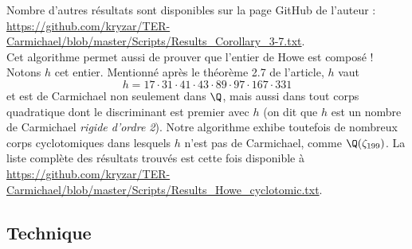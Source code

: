 \documentclass[a4paper, 12pt, oneside]{article}
\begin{document}
Nombre d'autres résultats sont disponibles sur la page GitHub de l'auteur : \url{https://github.com/kryzar/TER-Carmichael/blob/master/Scripts/Results_Corollary_3-7.txt}. \\

Cet algorithme permet aussi de prouver que l'entier de Howe est composé ! Notons $h$ cet entier. Mentionné après le théorème 2.7 de l'article, $h$ vaut $$h = 17 \cdot 31 \cdot 41 \cdot 43 \cdot 89 \cdot 97 \cdot 167 \cdot 331$$ et est de Carmichael non seulement dans $\Q$, mais aussi dans tout corps quadratique dont le discriminant est premier avec $h$ (on dit que $h$ est un nombre de Carmichael \emph{rigide d'ordre 2}). Notre algorithme exhibe toutefois de nombreux corps cyclotomiques dans lesquels $h$ n'est pas de Carmichael, comme $\Q(\zeta_{199})$. La liste complète des résultats trouvés est cette fois disponible à \url{https://github.com/kryzar/TER-Carmichael/blob/master/Scripts/Results_Howe_cyclotomic.txt}.


\subsection{Technique}
\end{document}
